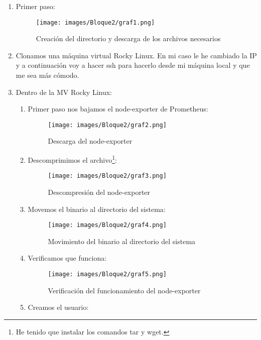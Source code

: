 \begin{enumerate}
    \item Primer paso:
    \begin{figure}[H]
        \centering
        \texttt{[image: images/Bloque2/graf1.png]}
        \caption{Creación del directorio y descarga de los archivos necesarios}
        \label{fig:instalacion}
    \end{figure}
    \item Clonamos una máquina virtual Rocky Linux. En mi caso le he cambiado la IP y a continuación voy a hacer ssh para hacerlo desde mi máquina local y que me sea más cómodo.
    \item Dentro de la MV Rocky Linux:
    \begin{enumerate}
        \item Primer paso nos bajamos el node-exporter de Prometheus:
        \begin{figure}[H]
            \centering
            \texttt{[image: images/Bloque2/graf2.png]}
            \caption{Descarga del node-exporter}
            \label{fig:node-exporter}
        \end{figure}
        \item Descomprimimos el archivo\footnote{He tenido que instalar los comandos tar y wget.}:
        \begin{figure}[H]
            \centering
            \texttt{[image: images/Bloque2/graf3.png]}
            \caption{Descompresión del node-exporter}
            \label{fig:descompresion}
        \end{figure}
        \item Movemos el binario al directorio del sistema:
        \begin{figure}[H]
            \centering
            \texttt{[image: images/Bloque2/graf4.png]}
            \caption{Movimiento del binario al directorio del sistema}
            \label{fig:movimiento}
        \end{figure}
        \item Verificamos que funciona:
        \begin{figure}[H]
            \centering
            \texttt{[image: images/Bloque2/graf5.png]}
            \caption{Verificación del funcionamiento del node-exporter}
            \label{fig:verificacion}
        \end{figure}
        \item Creamos el usuario:

\end{enumerate}
\end{enumerate}
